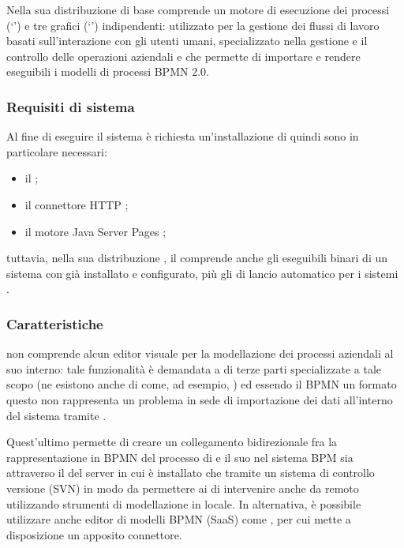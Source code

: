 Nella sua distribuzione di base comprende un motore di esecuzione dei processi (`') e tre  grafici (`') indipendenti:  utilizzato per la gestione dei flussi di lavoro basati sull'interazione con gli utenti umani,  specializzato nella gestione e il controllo delle operazioni aziendali e  che permette di importare e rendere eseguibili i modelli di processi BPMN 2.0.

\subsubsection{Requisiti di sistema}
Al fine di eseguire il sistema è richiesta un'installazione di  quindi sono in particolare necessari:
\begin{itemize}
  \item il  ;
  \item il connettore HTTP ;
  \item il motore Java Server Pages ;
\end{itemize}
tuttavia, nella sua distribuzione , il \sw comprende anche gli eseguibili binari di un sistema  con \progname già installato e configurato, più gli  di lancio automatico per i sistemi .

\subsubsection{Caratteristiche}
\progname non comprende alcun editor visuale per la modellazione dei processi aziendali al suo interno: tale funzionalità è demandata a \sw di terze parti specializzate a tale scopo (ne esistono anche di  come, ad esempio, ) ed essendo il BPMN un formato  questo non rappresenta un problema in sede di importazione dei dati all'interno del sistema tramite .

Quest'ultimo permette di creare un collegamento bidirezionale fra la rappresentazione in BPMN del processo di \bsn e il suo  nel sistema BPM sia attraverso il  del server in cui è installato \progname che tramite un sistema di controllo versione (SVN) in modo da permettere ai \bsn {} di intervenire anche da remoto utilizzando strumenti di modellazione in locale. In alternativa, è possibile utilizzare anche editor di modelli BPMN  (SaaS) come , per cui \progname mette a disposizione un apposito connettore.

